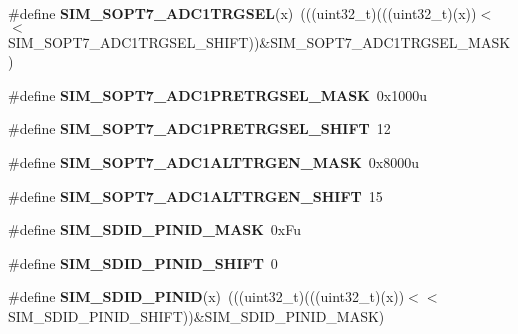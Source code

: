 \begin{DoxyCompactItemize}
\item 
\#define {\bfseries S\+I\+M\+\_\+\+S\+O\+P\+T7\+\_\+\+A\+D\+C1\+T\+R\+G\+S\+EL}(x)~(((uint32\+\_\+t)(((uint32\+\_\+t)(x))$<$$<$S\+I\+M\+\_\+\+S\+O\+P\+T7\+\_\+\+A\+D\+C1\+T\+R\+G\+S\+E\+L\+\_\+\+S\+H\+I\+FT))\&S\+I\+M\+\_\+\+S\+O\+P\+T7\+\_\+\+A\+D\+C1\+T\+R\+G\+S\+E\+L\+\_\+\+M\+A\+SK)\hypertarget{group__SIM__Register__Masks_ga5ee178887262b7141316f662e3d8a629}{}\label{group__SIM__Register__Masks_ga5ee178887262b7141316f662e3d8a629}

\item 
\#define {\bfseries S\+I\+M\+\_\+\+S\+O\+P\+T7\+\_\+\+A\+D\+C1\+P\+R\+E\+T\+R\+G\+S\+E\+L\+\_\+\+M\+A\+SK}~0x1000u\hypertarget{group__SIM__Register__Masks_gad5a05f77e88118ff1b5c02e4a756f527}{}\label{group__SIM__Register__Masks_gad5a05f77e88118ff1b5c02e4a756f527}

\item 
\#define {\bfseries S\+I\+M\+\_\+\+S\+O\+P\+T7\+\_\+\+A\+D\+C1\+P\+R\+E\+T\+R\+G\+S\+E\+L\+\_\+\+S\+H\+I\+FT}~12\hypertarget{group__SIM__Register__Masks_ga8cf171203a65ae7c3842b32a90562558}{}\label{group__SIM__Register__Masks_ga8cf171203a65ae7c3842b32a90562558}

\item 
\#define {\bfseries S\+I\+M\+\_\+\+S\+O\+P\+T7\+\_\+\+A\+D\+C1\+A\+L\+T\+T\+R\+G\+E\+N\+\_\+\+M\+A\+SK}~0x8000u\hypertarget{group__SIM__Register__Masks_ga784f68293064986f91f7a6221a67ed14}{}\label{group__SIM__Register__Masks_ga784f68293064986f91f7a6221a67ed14}

\item 
\#define {\bfseries S\+I\+M\+\_\+\+S\+O\+P\+T7\+\_\+\+A\+D\+C1\+A\+L\+T\+T\+R\+G\+E\+N\+\_\+\+S\+H\+I\+FT}~15\hypertarget{group__SIM__Register__Masks_gab364156b2cb9b83329803bdc8c0c589e}{}\label{group__SIM__Register__Masks_gab364156b2cb9b83329803bdc8c0c589e}

\item 
\#define {\bfseries S\+I\+M\+\_\+\+S\+D\+I\+D\+\_\+\+P\+I\+N\+I\+D\+\_\+\+M\+A\+SK}~0x\+Fu\hypertarget{group__SIM__Register__Masks_gaf0820acb74ce8270da2025fee624b47c}{}\label{group__SIM__Register__Masks_gaf0820acb74ce8270da2025fee624b47c}

\item 
\#define {\bfseries S\+I\+M\+\_\+\+S\+D\+I\+D\+\_\+\+P\+I\+N\+I\+D\+\_\+\+S\+H\+I\+FT}~0\hypertarget{group__SIM__Register__Masks_ga593faac0d0629fde52f6fe4b83614c23}{}\label{group__SIM__Register__Masks_ga593faac0d0629fde52f6fe4b83614c23}

\item 
\#define {\bfseries S\+I\+M\+\_\+\+S\+D\+I\+D\+\_\+\+P\+I\+N\+ID}(x)~(((uint32\+\_\+t)(((uint32\+\_\+t)(x))$<$$<$S\+I\+M\+\_\+\+S\+D\+I\+D\+\_\+\+P\+I\+N\+I\+D\+\_\+\+S\+H\+I\+FT))\&S\+I\+M\+\_\+\+S\+D\+I\+D\+\_\+\+P\+I\+N\+I\+D\+\_\+\+M\+A\+SK)\hypertarget{group__SIM__Register__Masks_ga64447ab3209ba3103c4d452b56c405a1}{}\label{group__SIM__Register__Masks_ga64447ab3209ba3103c4d452b56c405a1}


\end{DoxyCompactItemize}
